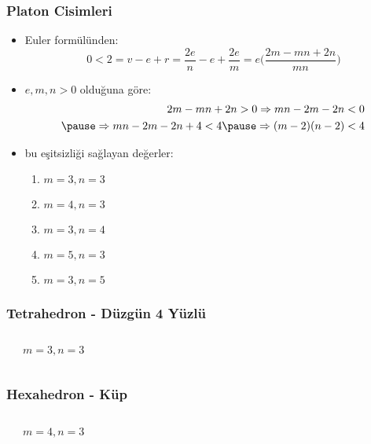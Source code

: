 \documentclass[dvipsnames]{beamer}
\theoremstyle{definition}
\theoremstyle{example}
\theoremstyle{plain}
\begin{document}
\begin{frame}
  \frametitle{Platon Cisimleri}

    \begin{itemize}
      \item Euler formülünden:
      \[
        0 < 2 = v - e + r = \frac{2e}{n} - e + \frac{2e}{m}
        = e \Big( \frac{2m-mn+2n}{mn} \Big)
      \]

      \pause
      \item $e,m,n > 0$ olduğuna göre:
      \begin{eqnarray*}
        2m - mn + 2n > 0 \Rightarrow mn - 2m -2n < 0 \\\pause
        \Rightarrow mn - 2m - 2n + 4 < 4 \pause \Rightarrow (m - 2)(n - 2) < 4
      \end{eqnarray*}

      \pause
      \item bu eşitsizliği sağlayan değerler:
      \begin{enumerate}
        \item $m=3, n=3$
        \item $m=4, n=3$
        \item $m=3, n=4$
        \item $m=5, n=3$
        \item $m=3, n=5$
      \end{enumerate}
    \end{itemize}
\end{frame}

\begin{frame}
  \frametitle{Tetrahedron - Düzgün 4 Yüzlü}

  \begin{columns}
    \begin{center}
    \end{center}

    \begin{center}

      $m=3, n=3$
    \end{center}
  \end{columns}
\end{frame}

\begin{frame}
  \frametitle{Hexahedron - Küp}

  \begin{columns}
    \begin{center}
    \end{center}

    \begin{center}

      $m=4, n=3$
    \end{center}
  \end{columns}
\end{frame}
\end{document}
